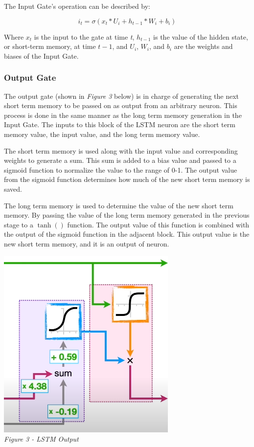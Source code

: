 \documentclass[12pt]{article}
\begin{document}
The Input Gate's operation can be described by:

\begin{equation}
    \label{eqn:i_t}
    i_t = \sigma(x_t*U_i + h_{t-1}*W_i + b_i)
\end{equation}

Where $x_t$ is the input to the gate at time \emph{t}, $h_{t-1}$ is the value
of the hidden state, or short-term memory, at time $t - 1$, and $U_i$, $W_i$,
and $b_i$ are the weights and biases of the Input Gate.

\subsubsection{Output Gate}

The output gate (shown in \emph{Figure 3} below) is in charge of generating the
next short term memory to be passed on as output from an arbitrary neuron. This
process is done in the same manner as the long term memory generation in the
Input Gate. The inputs to this block of the LSTM neuron are the short term
memory value, the input value, and the long term memory value.

The short term memory is used along with the input value and corresponding
weights to generate a sum. This sum is added to a bias value and passed to a
sigmoid function to normalize the value to the range of 0-1. The output value
from the sigmoid function determines how much of the new short term memory is
saved.

The long term memory is used to determine the value of the new short term
memory. By passing the value of the long term memory generated in the previous
stage to a $\tanh()$ function. The output value of this function is combined
with the output of the sigmoid function in the adjacent block. This output
value is the new short term memory, and it is an output of neuron.

\begin{center}
    \includegraphics{OutputGate.png}\\
    \emph{Figure 3 - LSTM Output}
\end{center}
\end{document}
